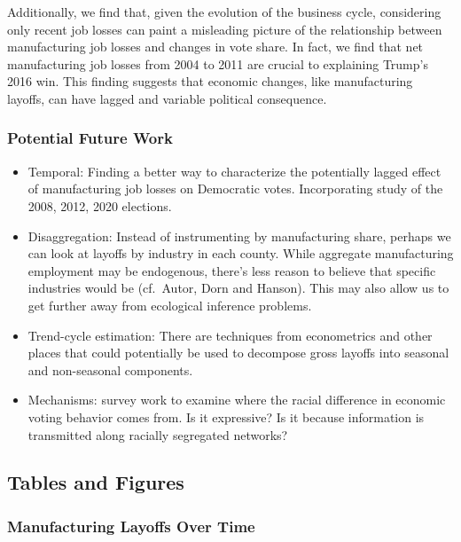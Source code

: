 \documentclass[
  12pt,
]{article}
\providecommand{\tightlist}{%
  \setlength{\itemsep}{0pt}\setlength{\parskip}{0pt}}
\begin{document}
Additionally, we find that, given the evolution of the business cycle,
considering only recent job losses can paint a misleading picture of the
relationship between manufacturing job losses and changes in vote share.
In fact, we find that net manufacturing job losses from 2004 to 2011 are
crucial to explaining Trump's 2016 win. This finding suggests that
economic changes, like manufacturing layoffs, can have lagged and
variable political consequence.

\hypertarget{potential-future-work}{%
\subsubsection{Potential Future Work}\label{potential-future-work}}

\begin{itemize}
\tightlist
\item
  Temporal: Finding a better way to characterize the potentially lagged
  effect of manufacturing job losses on Democratic votes. Incorporating
  study of the 2008, 2012, 2020 elections.
\item
  Disaggregation: Instead of instrumenting by manufacturing share,
  perhaps we can look at layoffs by industry in each county. While
  aggregate manufacturing employment may be endogenous, there's less
  reason to believe that specific industries would be (cf.~Autor, Dorn
  and Hanson). This may also allow us to get further away from
  ecological inference problems.
\item
  Trend-cycle estimation: There are techniques from econometrics and
  other places that could potentially be used to decompose gross layoffs
  into seasonal and non-seasonal components.
\item
  Mechanisms: survey work to examine where the racial difference in
  economic voting behavior comes from. Is it expressive? Is it because
  information is transmitted along racially segregated networks?
\end{itemize}

\hypertarget{tables-and-figures}{%
\subsection{Tables and Figures}\label{tables-and-figures}}

\hypertarget{manufacturing-layoffs-over-time}{%
\subsubsection{Manufacturing Layoffs Over
Time}\label{manufacturing-layoffs-over-time}}
\end{document}
